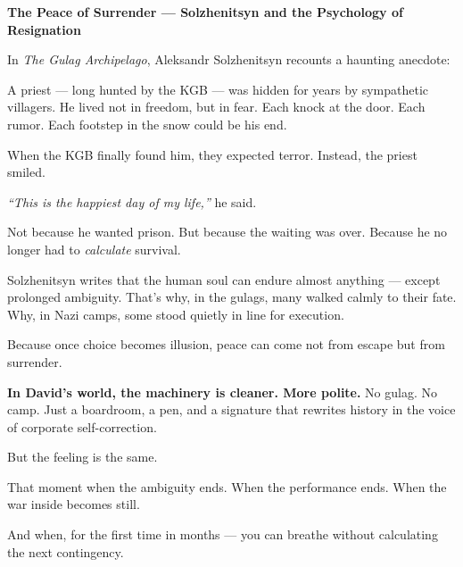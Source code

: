 \begin{HistoricalSidebar}{\textbf{The Peace of Surrender --- Solzhenitsyn and the Psychology of Resignation}}

    In \textit{The Gulag Archipelago}, Aleksandr Solzhenitsyn recounts a haunting anecdote:  

    \medskip
    
    A priest — long hunted by the KGB — was hidden for years by sympathetic villagers. He lived 
    not in freedom, but in fear.  
    Each knock at the door. Each rumor. Each footstep in the snow could be his end.  

    \medskip
    
    When the KGB finally found him, they expected terror.  
    Instead, the priest smiled.

    \medskip
    
    \textit{“This is the happiest day of my life,”} he said.

    \medskip
    
    Not because he wanted prison.  
    But because the waiting was over.  
    Because he no longer had to \textit{calculate} survival.  

    \medskip
    
    Solzhenitsyn writes that the human soul can endure almost anything --- 
    except prolonged ambiguity.  
    That’s why, in the gulags, many walked calmly to their fate.  
    Why, in Nazi camps, some stood quietly in line for execution.

    \medskip
    
    Because once choice becomes illusion, peace can come not from escape but from surrender.
    
    \medskip
    
    \textbf{In David’s world, the machinery is cleaner. More polite.}  
    No gulag. No camp.  
    Just a boardroom, a pen, and a signature that rewrites history in the voice of corporate 
    self-correction.

    \medskip
    
    But the feeling is the same.

    \medskip
    
    That moment when the ambiguity ends.  
    When the performance ends.  
    When the war inside becomes still.

    \medskip
    
    And when, for the first time in months —  
    you can breathe without calculating the next contingency.
    
\end{HistoricalSidebar}
    